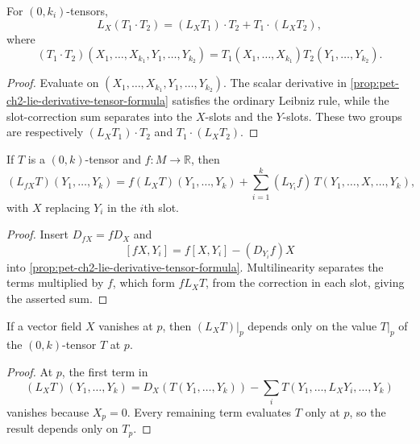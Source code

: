 \begin{proposition}
  \label{prop:pet-ch2-lie-derivative-product-rule}


  For $(0,k_i)$-tensors,
  \[
    L_X(T_1\cdot T_2)
      =(L_XT_1)\cdot T_2+T_1\cdot(L_XT_2),
  \]
  where
  \[
    (T_1\cdot T_2)(X_1,\dots,X_{k_1},Y_1,\dots,Y_{k_2})
      =T_1(X_1,\dots,X_{k_1})T_2(Y_1,\dots,Y_{k_2}).
  \]
\end{proposition}
\begin{proof}

  \sketch
  Evaluate on
  $(X_1,\dots,X_{k_1},Y_1,\dots,Y_{k_2})$. The scalar derivative in
  \cref{prop:pet-ch2-lie-derivative-tensor-formula} satisfies the ordinary
  Leibniz rule, while the slot-correction sum separates into the $X$-slots and
  the $Y$-slots. These two groups are respectively
  $(L_XT_1)\cdot T_2$ and $T_1\cdot(L_XT_2)$.
\end{proof}

\begin{proposition}
  \label{prop:pet-ch2-lie-derivative-scaling}


  If $T$ is a $(0,k)$-tensor and $f:M\to\mathbb{R}$, then
  \[
    (L_{fX}T)(Y_1,\dots,Y_k)
    = f(L_XT)(Y_1,\dots,Y_k)+\sum_{i=1}^k(L_{Y_i}f)\,T(Y_1,\dots,X,\dots,Y_k),
  \]
  with $X$ replacing $Y_i$ in the $i$th slot.
\end{proposition}
\begin{proof}

  \sketch
  Insert
  $D_{fX}=fD_X$ and
  \[
    [fX,Y_i]=f[X,Y_i]-(D_{Y_i}f)X
  \]
  into \cref{prop:pet-ch2-lie-derivative-tensor-formula}. Multilinearity
  separates the terms multiplied by $f$, which form $fL_XT$, from the
  correction in each slot, giving the asserted sum.
\end{proof}

\begin{lemma}
  \label{lem:pet-ch2-lie-derivative-local-vanishing}


  If a vector field $X$ vanishes at $p$, then $(L_XT)|_p$ depends only on the
  value $T|_p$ of the $(0,k)$-tensor $T$ at $p$.
\end{lemma}
\begin{proof}

  \sketch
  At $p$, the first term in
  \[
    (L_XT)(Y_1,\dots,Y_k)
      =D_X(T(Y_1,\dots,Y_k))
       -\sum_iT(Y_1,\dots,L_XY_i,\dots,Y_k)
  \]
  vanishes because $X_p=0$. Every remaining term evaluates $T$ only at $p$,
  so the result depends only on $T_p$.
\end{proof}

